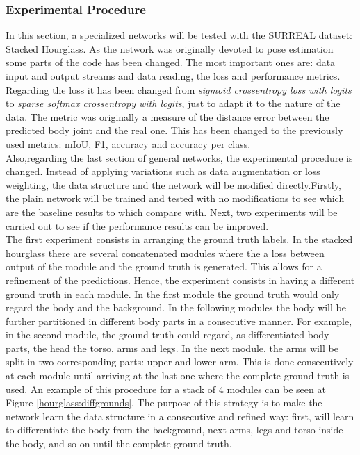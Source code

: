 \documentclass[12pt,a4paper]{article}
\begin{document}
\subsubsection{Experimental Procedure}

In this section, a specialized networks will be tested with the SURREAL dataset: Stacked Hourglass. As the network was originally devoted to pose estimation some parts of the code has been changed. The most important ones are: data input and output streams and data reading, the loss and performance metrics. Regarding the loss it has been changed from \textit{sigmoid crossentropy loss with logits} to \textit{sparse softmax crossentropy with logits}, just to adapt it to the nature of the data. The metric was originally a measure of the distance error between the predicted body joint and the real one. This has been changed to the previously used metrics: mIoU, F1, accuracy and accuracy per class.\\

Also,regarding the last section of general networks, the experimental procedure is changed. Instead of applying variations such as data augmentation or loss weighting, the data structure and the network will be modified directly.Firstly, the plain network will be trained and tested with no modifications to see which are the baseline results to which compare with. Next, two experiments will be carried out to see if the performance results can be improved.\\

The first experiment consists in arranging the ground truth labels. In the stacked hourglass there are several concatenated modules where the a loss between output of the module and the ground truth is generated. This allows for a refinement of the predictions. Hence, the experiment consists in having a different ground truth in each module. In the first module the ground truth would only regard the body and the background. In the following modules the body will be further partitioned in different body parts in a consecutive manner. For example, in the second module, the ground truth could regard, as differentiated body parts, the head the torso, arms and legs. In the next module, the arms will be split in two corresponding parts: upper and lower arm. This is done consecutively at each module until arriving at the last one where the complete ground truth is used. An example of this procedure for a stack of 4 modules can be seen at Figure \ref{hourglass:diffgrounds}. The purpose of this strategy is to  make the network learn the data structure in a consecutive and refined way: first, will learn to differentiate the body from the background, next arms, legs and torso inside the body, and so on until the complete ground truth. \\
\end{document}
